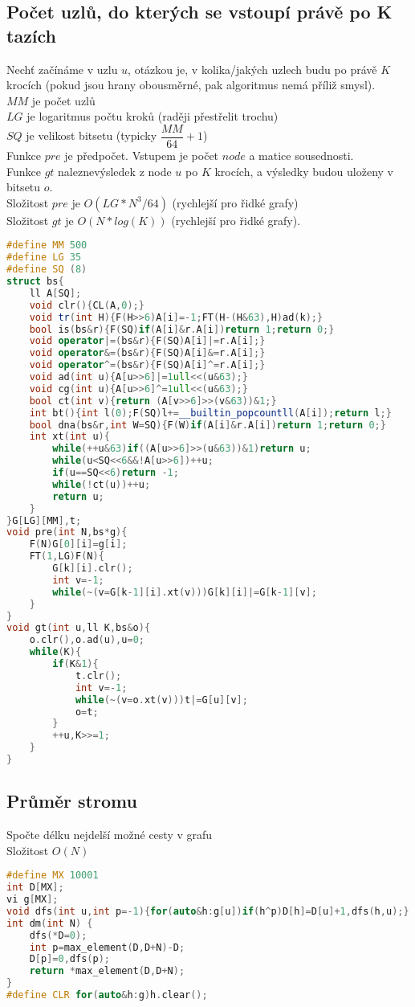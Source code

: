 \documentclass[11pt]{article}
\begin{document}
\subsection{Počet uzlů, do kterých se vstoupí právě po K tazích}
Nechť začínáme v uzlu $u$, otázkou je, v kolika/jakých uzlech budu po právě $K$ krocích (pokud jsou hrany obousměrné, pak algoritmus nemá příliž smysl).
\\$MM$ je počet uzlů
\\$LG$ je logaritmus počtu kroků (raději přestřelit trochu)
\\$SQ$ je velikost bitsetu (typicky $\dfrac{MM}{64}+1$)
\\Funkce $pre$ je předpočet. Vstupem je počet $node$ a matice sousednosti.
\\Funkce $gt$ naleznevýsledek z node $u$ po $K$ krocích, a výsledky budou uloženy v bitsetu $o$.
\\Složitost $pre$ je  $O(LG*N^3/64)$ (rychlejší pro řidké grafy)
\\Složitost $gt$ je $O(N*log(K))$ (rychlejší pro řidké grafy).
\begin{lstlisting}[language=C++]
#define MM 500
#define LG 35
#define SQ (8)
struct bs{
    ll A[SQ];
    void clr(){CL(A,0);}
    void tr(int H){F(H>>6)A[i]=-1;FT(H-(H&63),H)ad(k);}
    bool is(bs&r){F(SQ)if(A[i]&r.A[i])return 1;return 0;}
    void operator|=(bs&r){F(SQ)A[i]|=r.A[i];}
    void operator&=(bs&r){F(SQ)A[i]&=r.A[i];}
    void operator^=(bs&r){F(SQ)A[i]^=r.A[i];}
    void ad(int u){A[u>>6]|=1ull<<(u&63);}
    void cg(int u){A[u>>6]^=1ull<<(u&63);} 
    bool ct(int v){return (A[v>>6]>>(v&63))&1;}
    int bt(){int l(0);F(SQ)l+=__builtin_popcountll(A[i]);return l;}
    bool dna(bs&r,int W=SQ){F(W)if(A[i]&r.A[i])return 1;return 0;}
    int xt(int u){
        while(++u&63)if((A[u>>6]>>(u&63))&1)return u;
        while(u<SQ<<6&&!A[u>>6])++u;
        if(u==SQ<<6)return -1;
        while(!ct(u))++u;
        return u;
    }
}G[LG][MM],t;
void pre(int N,bs*g){
    F(N)G[0][i]=g[i];
    FT(1,LG)F(N){
        G[k][i].clr();
        int v=-1;
        while(~(v=G[k-1][i].xt(v)))G[k][i]|=G[k-1][v];
    }
}
void gt(int u,ll K,bs&o){
    o.clr(),o.ad(u),u=0;
    while(K){
        if(K&1){
            t.clr();
            int v=-1;
            while(~(v=o.xt(v)))t|=G[u][v];
            o=t;
        }
        ++u,K>>=1;
    }
}
\end{lstlisting}
\subsection{Průměr stromu}
Spočte délku nejdelší možné cesty v grafu
\\Složitost $O(N)$
\begin{lstlisting}[language=C++]
#define MX 10001
int D[MX];
vi g[MX];
void dfs(int u,int p=-1){for(auto&h:g[u])if(h^p)D[h]=D[u]+1,dfs(h,u);}
int dm(int N) {
    dfs(*D=0);
    int p=max_element(D,D+N)-D;
    D[p]=0,dfs(p);
    return *max_element(D,D+N);
}
#define CLR for(auto&h:g)h.clear();
\end{lstlisting}
\end{document}
